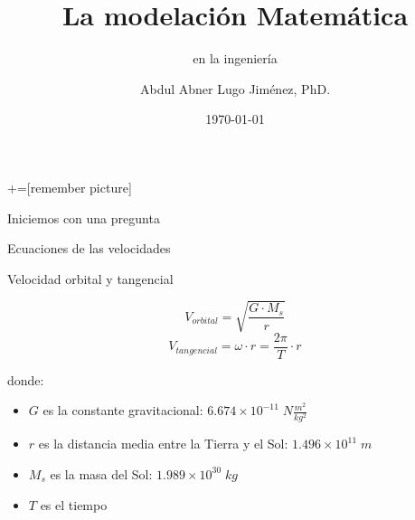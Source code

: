 \documentclass[11pt]{beamer}
\title{La modelación Matemática}
\subtitle{en la ingeniería}
\author{Abdul Abner Lugo Jiménez, PhD.}
\date{\today}
\institute{\url{alugo@ipl.edu.do}}
\begin{document}
+=[remember picture]
\everymath{\displaystyle}
\begin{frame}[plain,t]
\titlepage
\end{frame}

\begin{frame}{Iniciemos con una pregunta}
\\
\end{frame}

\begin{frame}{Ecuaciones de las velocidades}
\begin{block}{Velocidad orbital y tangencial}
\begin{multicols}{2}
\begin{equation*}
V_{orbital}=\sqrt{\dfrac{G\cdot M_{s}}{r}}
\end{equation*}\pause
\begin{equation*}
V_{tangencial}=\omega\cdot r=\dfrac{2\pi}{T}\cdot r
\end{equation*}
\end{multicols}
\end{block}\pause
donde:
\begin{itemize}[<+-| alert@+>]
     \item $G$ es la constante gravitacional: $6.674\times10^{-11}\;N\frac{m^2}{kg^2}$
     \item $r$ es la distancia media entre la Tierra y el Sol: $1.496\times10^{11}\;m$
     \item $M_s$ es la masa del Sol: $1.989\times10^{30}\;kg$
     \item $T$ es el tiempo
\end{itemize}
\end{frame}
\end{document}
